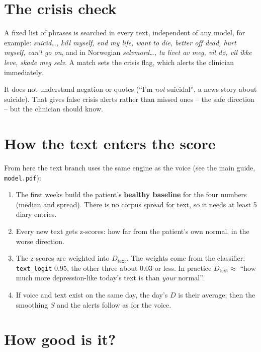 \documentclass[11pt,a4paper]{article}
\begin{document}
\section{The crisis check}

A fixed list of phrases is searched in every text, independent of any model, for example:
\emph{suicid\dots, kill myself, end my life, want to die, better off dead, hurt myself, can't go on},
and in Norwegian \emph{selvmord\dots, ta livet av meg, vil dø, vil ikke leve, skade meg selv}.
A match sets the crisis flag, which alerts the clinician immediately.

It does not understand negation or quotes (``I'm \emph{not} suicidal'', a news story about suicide).
That gives false crisis alerts rather than missed ones -- the safe direction -- but the clinician should
know.

\section{How the text enters the score}

From here the text branch uses the same engine as the voice (see the main guide, \texttt{model.pdf}):
\begin{enumerate}
\item The first weeks build the patient's \textbf{healthy baseline} for the four numbers (median and
      spread). There is no corpus spread for text, so it needs at least 5 diary entries.
\item Every new text gets z-scores: how far from the patient's own normal, in the worse direction.
\item The z-scores are weighted into $D_{\text{text}}$. The weights come from the classifier:
      \texttt{text\_logit} 0.95, the other three about 0.03 or less. In practice
      $D_{\text{text}}\approx$ ``how much more depression-like today's text is than \emph{your} normal''.
\item If voice and text exist on the same day, the day's $D$ is their average; then the smoothing $S$ and
      the alerts follow as for the voice.
\end{enumerate}

\section{How good is it?}
\end{document}
